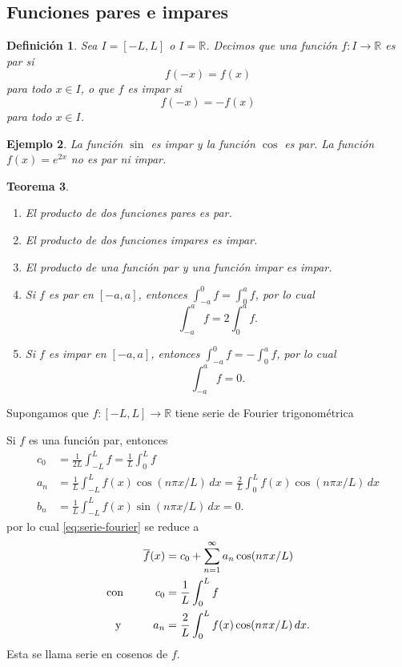 \documentclass[11pt,letterpaper,draft]{report}
\newtheorem{defn}{Definición}[chapter]
\newtheorem{theorem}[defn]{Teorema}
\newtheorem{example}[defn]{Ejemplo}
\newcommand\R{\mathbb R}
\newcommand\<{\langle}
\renewcommand\>{\rangle}
\begin{document}
\subsection{Funciones pares e impares}

\begin{defn}
  Sea $I=[-L,L]$ o $I=\R$.
  Decimos que una función $f:I\to\R$ es par si
  \[
    f(-x) = f(x)
  \]
  para todo $x\in I$, o que $f$ es impar si
  \[
    f(-x) = -f(x)
  \]
  para todo $x\in I$.
\end{defn}

\begin{example}
  La función $\sin$ es impar y la función $\cos$ es par.
  La función $f(x)=e^{2x}$ no es par ni impar.
\end{example}

\begin{theorem}
  \begin{enumerate}
    \item El producto de dos funciones pares es par.
    \item El producto de dos funciones impares es impar.
    \item El producto de una función par y una función impar es impar.
    \item Si $f$ es par en $[-a,a]$, entonces
      $\int_{-a}^{0}f=\int_{0}^{a}f$, por lo cual
      \[
        \int_{-a}^{a}f = 2\int_{0}^{a}f
      .\]
    \item Si $f$ es impar en $[-a,a]$, entonces
      $\int_{-a}^{0}f=-\int_{0}^{a}f$, por lo cual
      \[
        \int_{-a}^{a}f = 0
      .\]
  \end{enumerate}
\end{theorem}

Supongamos que $f:[-L,L]\to\R$ tiene serie de Fourier trigonométrica

Si $f$ es una función par, entonces
\begin{align*}
  c_0 &= \frac{1}{2L}\int_{-L}^L f = \frac{1}{L}\int_{0}^L f \\
  a_n
    &= \frac{1}{L}\int_{-L}^L f(x)\cos(n\pi x/L)\,dx
    = \frac{2}{L}\int_{0}^L f(x)\cos(n\pi x/L)\,dx \\
  b_n
    &= \frac{1}{L}\int_{-L}^L f(x)\sin(n\pi x/L)\,dx
    = 0.
\end{align*}
por lo cual \eqref{eq:serie-fourier} se reduce a
\begin{equation}\label{eq:fourier-par}
\begin{aligned}
  \overline{f}(x)
  &=
  c_0
  +
  \sum_{n=1}^{\infty}a_n\cos(n\pi x/L) \\
  \text{con} \hspace{10mm}
  c_0 &= \frac{1}{L}\int_{0}^L f \\
  \text{y} \hspace{10mm}
  a_n &= \frac{2}{L}\int_{0}^L f(x)\cos(n\pi x/L)\,dx.
\end{aligned}
\end{equation}
Esta se llama serie en cosenos de $f$.
\end{document}
